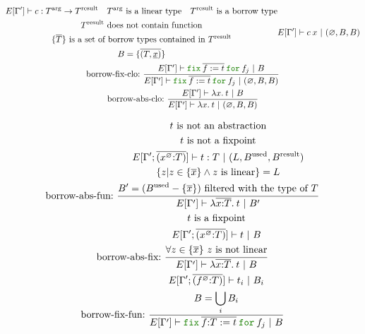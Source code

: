 \documentclass[a4paper,fleqn]{article}
\newcommand{\kwfix}{\mbox{\color{mygreen}\ttfamily fix}}
\newcommand{\kwfor}{\mbox{\color{mygreen}\ttfamily for}}
\newcommand{\lam}[2]{\lambda #1.\:#2}
\newcommand{\lassum}[2]{(#1\mathord{:}#2)}
\newcommand{\ofix}[2]{\kwfix\:{#1}\:\kwfor\:{#2}}
\begin{document}
\begin{gather*}
{\begin{gathered}
        E[\Gamma'] \vdash c : T^\text{arg} \rightarrow T^\text{result} \quad
        \text{$T^\text{arg}$ is a linear type} \quad
        \text{$T^\text{result}$ is a borrow type} \\
        \text{$T^\text{result}$ does not contain function} \\
        \text{$\{\overline{T}\}$ is a set of borrow types contained in $T^\text{result}$} \\
        B = \{\overline{(T,\underline{x})}\}
      \end{gathered}
    }{
      E[\Gamma'] \vdash c\:x ~|~ (\varnothing, B, B)
    } \\
  \text{borrow-fix-clo:}~
    \dfrac{
      E[\Gamma'] \vdash \ofix{\overline{f:=t}}{f_j} ~|~ B
    }{
      E[\Gamma'] \vdash \ofix{\overline{f:=t}}{f_j} ~|~ (\varnothing, B, B)
    } \\
  \text{borrow-abs-clo:}~
    \dfrac{
      E[\Gamma'] \vdash \lam{x}{t} ~|~ B
    }{
      E[\Gamma'] \vdash \lam{x}{t} ~|~ (\varnothing, B, B)
    } \\
\end{gather*}

\begin{gather*}
  \text{borrow-abs-fun:}~
    \dfrac{
      \begin{gathered}
        \text{$t$ is not an abstraction} \\
        \text{$t$ is not a fixpoint} \\
        E[\Gamma';\overline{\lassum{x^\varnothing}{T}}] \vdash t : T ~|~ (L,B^\text{used},B^\text{result}) \\
        \{ z | z \in \{\overline{x}\} \wedge \text{$z$ is linear} \} = L \\
        B' = (B^\text{used} - \{\overline{x}\}) ~\text{filtered with the type of $T$} \\
      \end{gathered}
    }{
      E[\Gamma'] \vdash \lam{\overline{x{:}T}}{t} ~|~ B'
    } \\
  \text{borrow-abs-fix:}~
    \dfrac{
      \begin{gathered}
        \text{$t$ is a fixpoint} \\
        E[\Gamma';\overline{\lassum{x^\varnothing}{T}}] \vdash t ~|~ B \\
        \forall z \in \{\overline{x}\}~ \text{$z$ is not linear} \\
      \end{gathered}
    }{
      E[\Gamma'] \vdash \lam{\overline{x{:}T}}{t} ~|~ B
    } \\
  \text{borrow-fix-fun:}~
    \dfrac{
      \begin{gathered}
        E[\Gamma';\overline{\lassum{f^\varnothing}{T}}] \vdash t_i ~|~ B_i \\
        B = \bigcup_i B_i
      \end{gathered}
    }{
      E[\Gamma'] \vdash \ofix{\overline{f{:}T:=t}}{f_j} ~|~ B
    }
\end{gather*}
\end{document}
